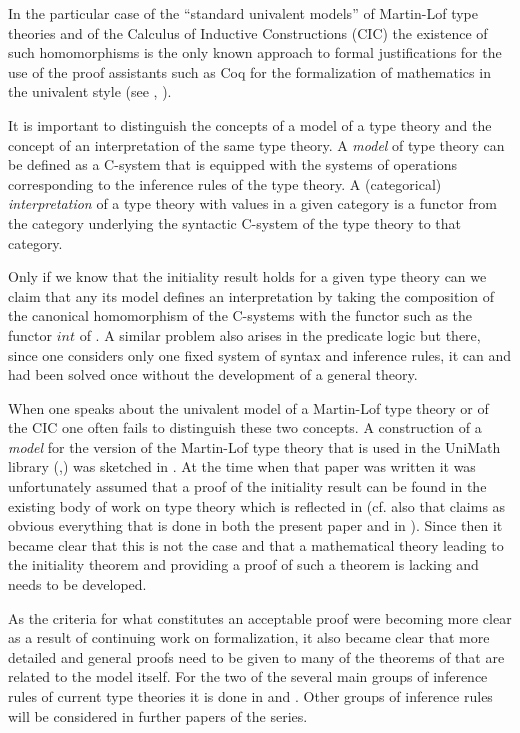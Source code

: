 \documentclass[11pt]{article}
\begin{document}
In the particular case of the ``standard univalent models'' of  Martin-Lof type theories and of the Calculus of Inductive Constructions (CIC) the existence of such homomorphisms is the only known approach to formal justifications for the use of the proof assistants such as Coq for the formalization of mathematics in the univalent style (see \cite{UniMath}, \cite{UniMath2015}). 

It is important to distinguish the concepts of a model of a type theory and the concept of an interpretation of the same type theory. A {\em model} of type theory can be defined as a C-system that is equipped with the systems of operations corresponding to the inference rules of the type theory. A (categorical) {\em interpretation} of a type theory with values in a given category is a functor from the category underlying the syntactic C-system of the type theory to that category. 

Only if we know that the initiality result holds for a given type theory can we claim that any its model defines an interpretation by taking the composition of the canonical homomorphism of the C-systems with the functor such as the functor $int$ of \cite{Cfromauniverse}. A similar problem also arises in the predicate logic but there, since one considers only one fixed system of syntax and inference rules, it can and had been solved once without the development of a general theory. 

When one speaks about the univalent model of a Martin-Lof type theory or of the CIC one often fails to distinguish these two concepts.  A construction of a {\em model} for the version of the Martin-Lof type theory that is used in the UniMath library (\cite{UniMath},\cite{UniMath2015})  was sketched in \cite{KLV1}. At the time when that paper was written it was unfortunately assumed that a proof of the initiality result can be found in the existing body of work on type theory which is reflected  in \cite[Theorem 1.2.9]{KLV1} (cf. also \cite[Example 1.2.3]{KLV1} that claims as obvious everything that is done in both the present paper and in \cite{Csubsystems}).  Since then it became clear that this is not the case and that a mathematical theory leading to the initiality theorem and providing a proof of such a theorem is lacking and needs to be developed. 

As the criteria for what constitutes an acceptable proof were becoming more clear as a result of continuing work on formalization, it also became clear that more detailed and general proofs need to be given to many of the theorems of \cite{KLV1} that are related to the model itself. For the two of the several main groups of inference rules of current type theories it is done in \cite{fromunivwithPi} and \cite{fromunivwithpaths}. Other groups of inference rules will be considered in further papers of the series. 
\end{document}
